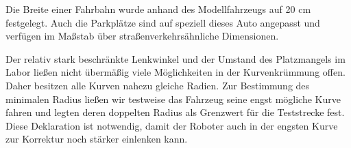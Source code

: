 Die Breite einer Fahrbahn wurde anhand des Modellfahrzeugs auf 20 cm festgelegt. Auch die Parkplätze sind auf speziell dieses Auto angepasst und verfügen im Maßstab über straßenverkehrsähnliche Dimensionen.

Der relativ stark beschränkte Lenkwinkel und der Umstand des Platzmangels im Labor ließen nicht übermäßig viele Möglichkeiten in der Kurvenkrümmung offen. Daher besitzen alle Kurven nahezu gleiche Radien. Zur Bestimmung des minimalen Radius ließen wir testweise das Fahrzeug seine engst mögliche Kurve fahren und legten deren doppelten Radius als Grenzwert für die Teststrecke fest. Diese Deklaration ist notwendig, damit der Roboter auch in der engsten Kurve zur Korrektur noch stärker einlenken kann.

